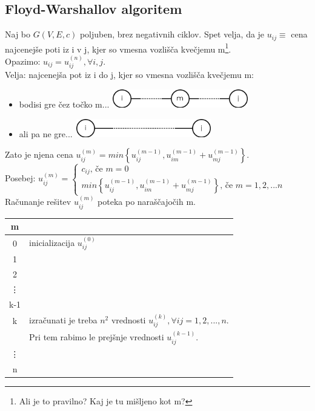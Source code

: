 \documentclass[a4paper,10pt]{article}
\begin{document}
\subsection{Floyd-Warshallov algoritem}

Naj bo $G(V, E, c)$ poljuben, brez negativnih ciklov. Spet velja, da je $u_{ij} \equiv$ cena najcenej\v se poti iz i v j, kjer so vmesna vozli\v s\v ca kve\v cjemu m\footnote{Ali je to pravilno? Kaj je tu mi\v sljeno kot m?}.\\
Opazimo: $u_{ij} = u_{ij}^{(n)}, \forall i,j$.\\
Velja: najcenej\v sa pot iz i do j, kjer so vmesna vozli\v s\v ca kve\v cjemu m:
\begin{itemize}
\item bodisi gre \v cez to\v cko m...
	\includegraphics[width=5.95cm,height=0.8cm]{Slike/FloydWarshallUvod1.png}
\item ali pa ne gre...
	\includegraphics[width=5.95cm,height=0.8cm]{Slike/FloydWarshallUvod2.png}
\end{itemize}
Zato je njena cena $u_{ij}^{(m)} = min \left\lbrace u_{ij}^{(m-1)}, u_{im}^{(m-1)} + u_{mj}^{(m-1)} \right\rbrace$.\\
Posebej: 
$
u_{ij}^{(m)} = \left\lbrace 
\begin{array}{l}
c_{ij} \mbox{, \v ce }m = 0\\
min \left\lbrace u_{ij}^{(m-1)}, u_{im}^{(m-1)} + u_{mj}^{(m-1)} \right\rbrace \mbox{, \v ce } m = 1, 2,... n
\end{array}
\right.
$\\
Ra\v cunanje re\v sitev $u_{ij}^{(m)}$ poteka po nara\v s\v cajo\v cih m.\\
\begin{center}
\begin{tabular}{c|l}\hline
m	&	\\\hline
0	& inicializacija $u_{ij}^{(0)}$\\
1	&	\\
2	&	\\
\vdots	&	\\
k-1	&	\\
k	& izra\v cunati je treba $n^2$ vrednosti $u_{ij}^{(k)}, \forall ij = 1, 2,..., n$.\\
	& Pri tem rabimo le prej\v snje vrednosti $u_{ij}^{(k-1)}$.\\
\vdots	&	\\
n	&
\end{tabular}
\end{center}
\end{document}
